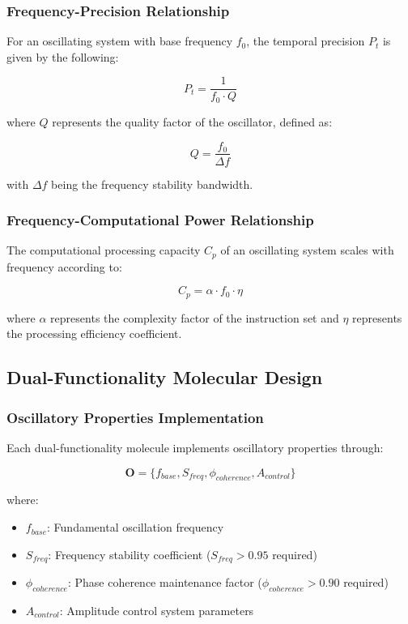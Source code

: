 \documentclass[12pt,a4paper]{article}
\begin{document}
\subsubsection{Frequency-Precision Relationship}

For an oscillating system with base frequency $f_0$, the temporal precision $P_t$ is given by the following:

\begin{equation}
P_t = \frac{1}{f_0 \cdot Q}
\end{equation}

where $Q$ represents the quality factor of the oscillator, defined as:

\begin{equation}
Q = \frac{f_0}{\Delta f}
\end{equation}

with $\Delta f$ being the frequency stability bandwidth.

\subsubsection{Frequency-Computational Power Relationship}

The computational processing capacity $C_p$ of an oscillating system scales with frequency according to:

\begin{equation}
C_p = \alpha \cdot f_0 \cdot \eta
\end{equation}

where $\alpha$ represents the complexity factor of the instruction set and $\eta$ represents the processing efficiency coefficient.

\subsection{Dual-Functionality Molecular Design}

\subsubsection{Oscillatory Properties Implementation}

Each dual-functionality molecule implements oscillatory properties through:

\begin{equation}
\boldsymbol{O} = \{f_{base}, S_{freq}, \phi_{coherence}, A_{control}\}
\end{equation}

where:
\begin{itemize}
\item $f_{base}$: Fundamental oscillation frequency
\item $S_{freq}$: Frequency stability coefficient ($S_{freq} > 0.95$ required)
\item $\phi_{coherence}$: Phase coherence maintenance factor ($\phi_{coherence} > 0.90$ required)  
\item $A_{control}$: Amplitude control system parameters
\end{itemize}
\end{document}
